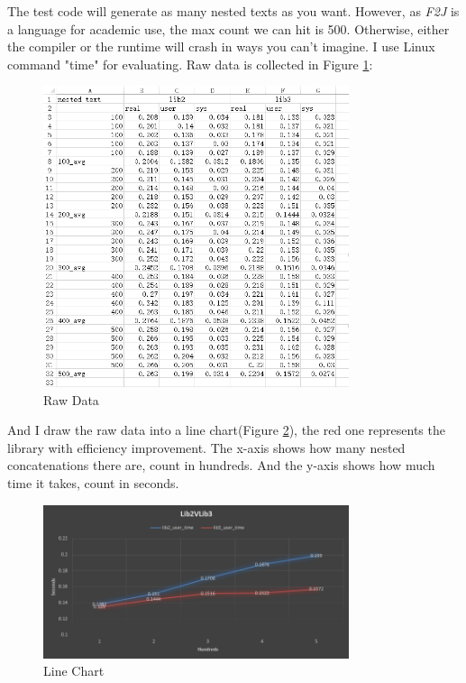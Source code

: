 The test code will generate as many nested texts as you want. However, as \textit{F2J} is a language for academic use, the max count we can hit is 500. Otherwise, either the compiler or the runtime will crash in ways you can't imagine. I use Linux command "time" for evaluating. Raw data is collected in Figure \ref{fig:efficiency comparation}:
\begin{figure}[h!]
    \centering
    \includegraphics[width=0.8\textwidth]{imgs/raw_data}
    \caption{Raw Data}
    \label{fig:efficiency comparation}
\end{figure}
And I draw the raw data into a line chart(Figure \ref{fig:efficiency line chart}), the red one represents the library with efficiency improvement. The x-axis shows how many nested concatenations there are, count in hundreds. And the y-axis shows how much time it takes, count in seconds.
\begin{figure}[h!]
    \centering
    \includegraphics[width=0.8\textwidth]{imgs/compare}
    \caption{Line Chart}
    \label{fig:efficiency line chart}
\end{figure}


